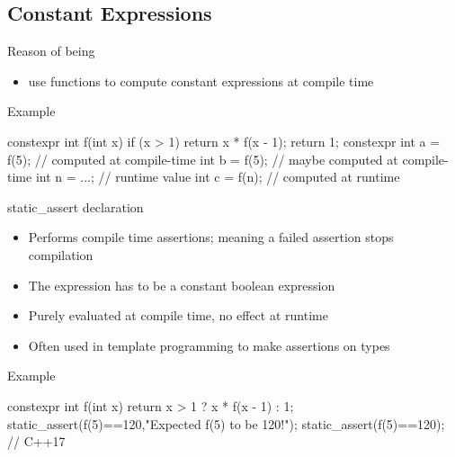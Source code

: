 \subsection[cstexpr]{Constant Expressions}

\begin{frame}[fragile]
  \begin{block}{Reason of being}
    \begin{itemize}
    \item use functions to compute constant expressions at compile time
    \end{itemize}
  \end{block}
  \pause
  \begin{exampleblock}{Example}
    \begin{cppcode*}{}
      constexpr int f(int x) {
        if (x > 1) return x * f(x - 1);
        return 1;
      }
      constexpr int a = f(5); // computed at compile-time
      int b = f(5); // maybe computed at compile-time
      int n = ...;  // runtime value
      int c = f(n); // computed at runtime
    \end{cppcode*}
  \end{exampleblock}
\end{frame}

\begin{frame}[fragile]
  \begin{block}{static\_assert declaration}
    \begin{itemize}
    \item Performs compile time assertions; meaning a failed assertion stops compilation
    \item The expression has to be a constant boolean expression
    \item Purely evaluated at compile time, no effect at runtime
    \item Often used in template programming to make assertions on types
    \end{itemize}
  \end{block}
  \pause
  \begin{exampleblock}{Example}
    \begin{cppcode*}{}
      constexpr int f(int x) {
        return x > 1 ? x * f(x - 1) : 1;
      }
      static_assert(f(5)==120,"Expected f(5) to be 120!");
      static_assert(f(5)==120); // C++17
    \end{cppcode*}
  \end{exampleblock}
\end{frame}

